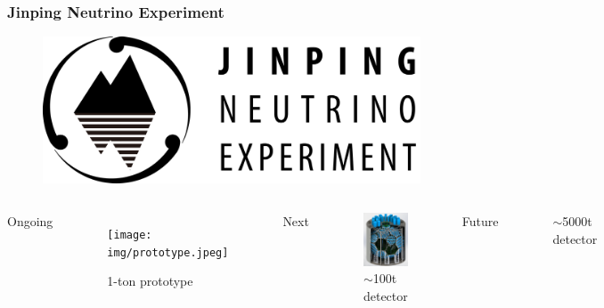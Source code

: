 \documentclass{beamer}
\begin{document}
\begin{frame}
\frametitle{Jinping Neutrino Experiment}
\setlength{\abovecaptionskip}{-2mm}
\begin{figure}
    \centering
    \includegraphics[width=0.25\linewidth]{img/J.png}
\end{figure}
\vspace{-4mm}
\begin{columns}
\begin{center}
    Ongoing
\end{center}
\begin{figure}
    \centering
    \caption{1-ton prototype}
    \texttt{[image: img/prototype.jpeg]}
\end{figure}
\begin{center}
    Next
\end{center}
\begin{figure}
    \centering
    \caption{$\sim$100t detector}
    \includegraphics[width=0.6\linewidth]{img/100tondetector.png}
\end{figure}
\begin{center}
    Future
\end{center}
\begin{figure}
    \centering
    \caption{$\sim$5000t detector}

\end{figure}
\end{columns}
\end{frame}
\end{document}
